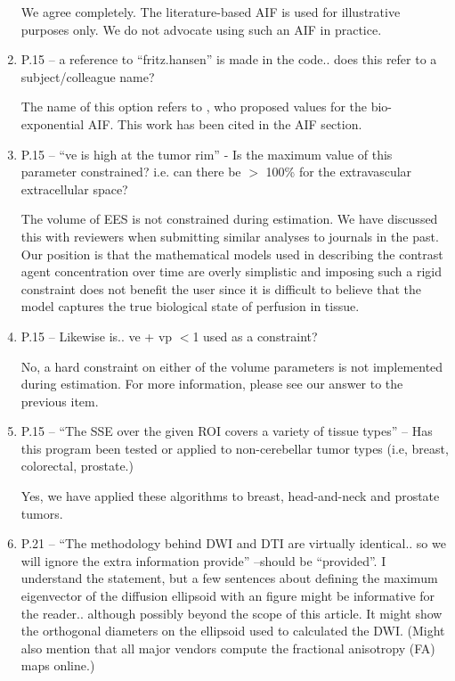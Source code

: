 \documentclass[11pt]{article}
\begin{document}
\begin{enumerate}
  We agree completely.  The literature-based AIF is used for
  illustrative purposes only.  We do not advocate using such an AIF in
  practice.

\item P.15 – a reference to ``fritz.hansen'' is made in the
  code.. does this refer to a subject/colleague name?

  The name of this option refers to \citet{fri-etal:measurement}, who
  proposed values for the bio-exponential AIF.  This work has been
  cited in the AIF section.

\item P.15 – ``ve is high at the tumor rim'' - Is the maximum value of
  this parameter constrained? i.e. can there be $>$ 100\% for the
  extravascular extracellular space?

  The volume of EES is not constrained during estimation.  We have
  discussed this with reviewers when submitting similar analyses to
  journals in the past.  Our position is that the mathematical models
  used in describing the contrast agent concentration over time are
  overly simplistic and imposing such a rigid constraint does not
  benefit the user since it is difficult to believe that the model
  captures the true biological state of perfusion in tissue.

\item P.15 – Likewise is.. ve + vp $<$1 used as a constraint?

  No, a hard constraint on either of the volume parameters is not
  implemented during estimation.  For more information, please see our
  answer to the previous item.

\item P.15 – ``The SSE over the given ROI covers a variety of tissue
  types'' – Has this program been tested or applied to non-cerebellar
  tumor types (i.e, breast, colorectal, prostate.)

  Yes, we have applied these algorithms to breast, head-and-neck and
  prostate tumors.

\item P.21 – ``The methodology behind DWI and DTI are virtually
  identical.. so we will ignore the extra information provide''
  –should be ``provided''.  I understand the statement, but a few
  sentences about defining the maximum eigenvector of the diffusion
  ellipsoid with an figure might be informative for the
  reader.. although possibly beyond the scope of this article. It
  might show the orthogonal diameters on the ellipsoid used to
  calculated the DWI. (Might also mention that all major vendors
  compute the fractional anisotropy (FA) maps online.)


\end{enumerate}
\end{document}
